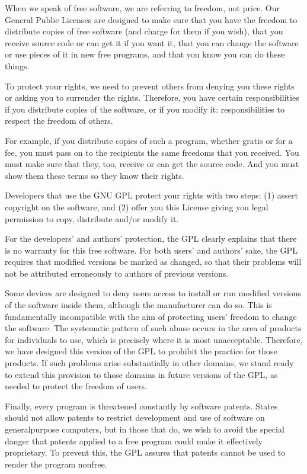 \documentclass[letterpaper,10pt,english]{sphinxmanual}
\begin{document}
When we speak of free software, we are referring to freedom, not price. Our General Public Licenses are designed to make sure that you have the freedom to distribute copies of free software (and charge for them if you wish), that you receive source code or can get it if you want it, that you can change the software or use pieces of it in new free programs, and that you know you can do these things.

To protect your rights, we need to prevent others from denying you these rights or asking you to surrender the rights. Therefore, you have certain responsibilities if you distribute copies of the software, or if you modify it: responsibilities to respect the freedom of others.

For example, if you distribute copies of such a program, whether gratis or for a fee, you must pass on to the recipients the same freedoms that you received. You must make sure that they, too, receive or can get the source code. And you must show them these terms so they know their rights.

Developers that use the GNU GPL protect your rights with two steps: (1) assert copyright on the software, and (2) offer you this License giving you legal permission to copy, distribute and/or modify it.

For the developers’ and authors’ protection, the GPL clearly explains that there is no warranty for this free software. For both users’ and authors’ sake, the GPL requires that modified versions be marked as changed, so that their problems will not be attributed erroneously to authors of previous versions.

Some devices are designed to deny users access to install or run modified versions of the software inside them, although the manufacturer can do so. This is fundamentally incompatible with the aim of protecting users’ freedom to change the software. The systematic pattern of such abuse occurs in the area of products for individuals to use, which is precisely where it is most unacceptable. Therefore, we have designed this version of the GPL to prohibit the practice for those products. If such problems arise substantially in other domains, we stand ready to extend this provision to those domains in future versions of the GPL, as needed to protect the freedom of users.

Finally, every program is threatened constantly by software patents. States should not allow patents to restrict development and use of software on general\sphinxhyphen{}purpose computers, but in those that do, we wish to avoid the special danger that patents applied to a free program could make it effectively proprietary. To prevent this, the GPL assures that patents cannot be used to render the program non\sphinxhyphen{}free.
\end{document}
